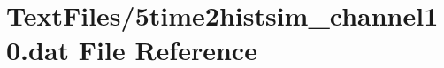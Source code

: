 \hypertarget{5time2histsim__channel10_8dat}{}\section{Text\+Files/5time2histsim\+\_\+channel10.dat File Reference}
\label{5time2histsim__channel10_8dat}
